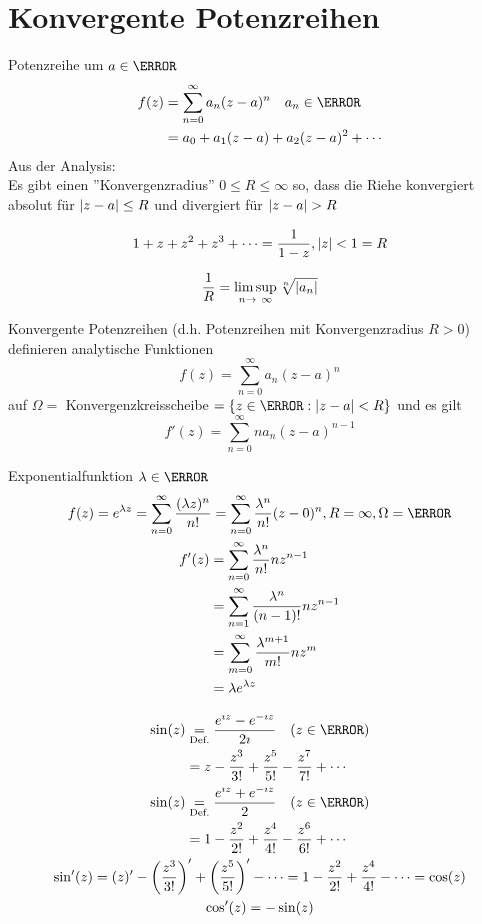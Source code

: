 \section{Konvergente Potenzreihen}
Potenzreihe um $a \in \C$
\[ \begin{split}
	f(z)	&= \sum_{n = 0}^\infty a_n (z-a)^n \quad a_n \in \C \\
		&= a_0 + a_1 (z-a) + a_2 (z-a)^2 + \dotsb
\end{split} \]
Aus der Analysis: \\
Es gibt einen ''Konvergenzradius'' $0 \leq R \leq \infty$ so, dass die Riehe konvergiert absolut für $\abs{z-a} \leq R$ und divergiert für $\abs{z-a} > R$ \\
\begin{bsp*}
	\[ 1 + z + z^2 + z^3 + \dotsb = \frac{1}{1 - z} , \abs{z} < 1 = R \]
\end{bsp*}
\[ \frac{1}{R} = \limsup_{n \rightarrow \infty} \sqrt[n]{\abs{a_n}} \]
\begin{satz*}
	Konvergente Potenzreihen (d.h. Potenzreihen mit Konvergenzradius $R > 0$) definieren analytische Funktionen
	\[ f(z) = \sum_{n = 0}^\infty a_n (z-a)^n \]
	auf $\Omega =$ Konvergenzkreisscheibe $= \{ z \in \C : \abs{z-a} < R \}$ und es gilt
	\[ f'(z) = \sum_{n = 0}^\infty n a_n (z-a)^{n-1} \]
\end{satz*}
\begin{bsp}
	Exponentialfunktion $\lambda \in \C$
	\begin{gather*}
		f(z) = e^{\lambda z} = \sum_{n = 0}^\infty \frac{(\lambda z)^n}{n!} = \sum_{n = 0}^\infty \frac{\lambda^n}{n!} (z-0)^n , R = \infty , \Omega = \C \\
		\begin{split}
			f'(z)	&= \sum_{n=0}^\infty \frac{\lambda^n}{n!} n z^{n-1} \\
				&= \sum_{n=1}^\infty \frac{\lambda^n}{(n-1)!} n z^{n-1} \\
				&= \sum_{m=0}^\infty \frac{\lambda^{m+1}}{m!} n z^m \\
				&= \lambda e^{\lambda z}
		\end{split}
	\end{gather*}
\end{bsp}
\begin{gather*}
	\begin{split}
		\sin(z)	&\underset{\text{Def.}}{=} \frac{e^{\imath z} - e^{-\imath z}}{2\imath} \quad (z \in \C) \\
				&= z - \frac{z^3}{3!} + \frac{z^5}{5!} - \frac{z^7}{7!} + \dotsb
	\end{split} \\
	\begin{split}
		\sin(z)	&\underset{\text{Def.}}{=} \frac{e^{\imath z} + e^{-\imath z}}{2} \quad (z \in \C) \\
				&= 1 - \frac{z^2}{2!} + \frac{z^4}{4!} - \frac{z^6}{6!} + \dotsb
	\end{split} \\
	\sin'(z) = (z)' - \left( \frac{z^3}{3!} \right)' + \left( \frac{z^5}{5!} \right)' - \dotsb = 1 - \frac{z^2}{2!} + \frac{z^4}{4!} -\dotsb = \cos(z) \\
	\cos'(z) = -\sin(z)
\end{gather*}

